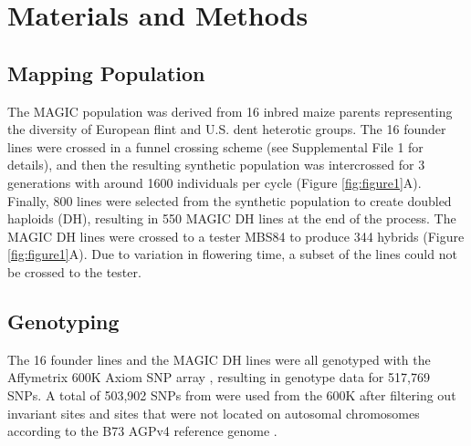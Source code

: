 \documentclass[article,9pt,twocolumn,twoside]{rilabRxiv}
\begin{document}
\section{Materials and Methods}
\label{sec:materials:methods}
\subsection{Mapping Population}
The MAGIC population was derived from 16 inbred maize parents representing the diversity of European flint and U.S. dent heterotic groups.
The 16 founder lines were crossed in a funnel crossing scheme (see Supplemental File 1 for details), and then the resulting synthetic population was intercrossed for 3 generations with around 1600 individuals per cycle (Figure \ref{fig:figure1}A).
Finally, 800 lines were selected from the synthetic population to create doubled haploids (DH), resulting in 550 MAGIC DH lines at the end of the process.
The MAGIC DH lines were crossed to a tester MBS84 to produce 344 hybrids (Figure \ref{fig:figure1}A).
Due to variation in flowering time, a subset of the lines could not be crossed to the tester.

\subsection{Genotyping}
The 16 founder lines and the MAGIC DH lines were all genotyped with the Affymetrix 600K Axiom SNP array \citep{Unterseer}, resulting in genotype data for 517,769 SNPs.
A  total of 503,902 SNPs from were used from the  600K after filtering out invariant sites and sites that were not located on autosomal chromosomes according to the B73 AGPv4 reference genome \citep{Jiao}.
\end{document}
